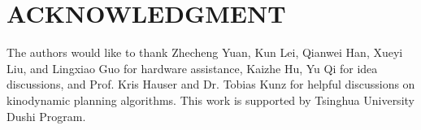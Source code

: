 \documentclass[letterpaper, 10 pt, conference]{ieeeconf}  %
\begin{document}

\section*{ACKNOWLEDGMENT}

The authors would like to thank Zhecheng Yuan, Kun Lei, Qianwei Han, Xueyi Liu, and Lingxiao Guo for hardware assistance, Kaizhe Hu, Yu Qi for idea discussions, and Prof. Kris Hauser and Dr. Tobias Kunz for helpful discussions on kinodynamic planning algorithms. This work is supported by Tsinghua University Dushi Program.




\end{document}
